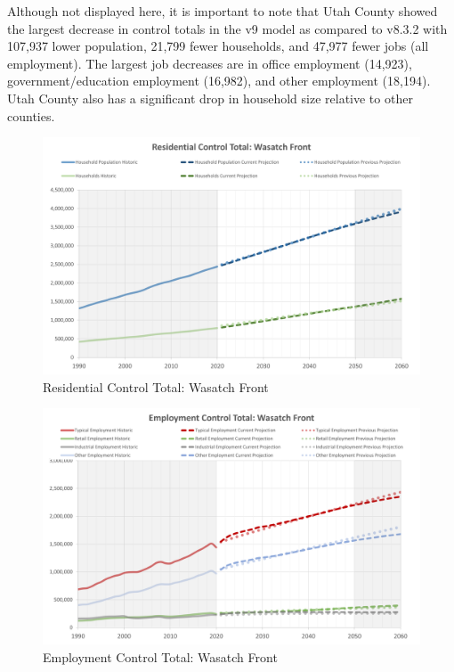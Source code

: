 \documentclass[
  letterpaper,
  DIV=11,
  numbers=noendperiod]{scrreprt}
\begin{document}
Although not displayed here, it is important to note that Utah County
showed the largest decrease in control totals in the v9 model as
compared to v8.3.2 with 107,937 lower population, 21,799 fewer
households, and 47,977 fewer jobs (all employment). The largest job
decreases are in office employment (14,923), government/education
employment (16,982), and other employment (18,194). Utah County also has
a significant drop in household size relative to other counties.

\begin{figure}[H]

{\centering \includegraphics{v9x/v900/whats-new/_pictures/pdf-residential-control.png}

}

\caption{\label{fig-pdf-res-control}Residential Control Total: Wasatch
Front}

\end{figure}

\begin{figure}[H]

{\centering \includegraphics{v9x/v900/whats-new/_pictures/pdf-employment-control.png}

}

\caption{\label{fig-pdf-emp-control}Employment Control Total: Wasatch
Front}

\end{figure}
\end{document}
